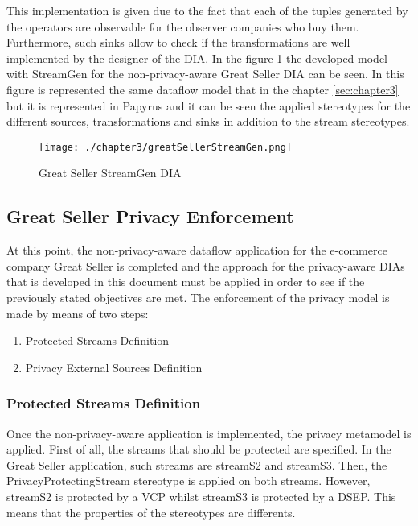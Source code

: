 This implementation is given due to the fact that each of the tuples generated by the operators are observable for the observer companies who buy them. Furthermore, such sinks allow to check if the transformations are well implemented by the designer of the DIA. In the figure \ref{fig:Great Seller StreamGen DIA} the developed model with StreamGen for the non-privacy-aware Great Seller DIA can be seen. In this figure is represented the same dataflow model that in the chapter \ref{sec:chapter3} but it is represented in Papyrus and it can be seen the applied stereotypes for the different sources, transformations and sinks in addition to the stream stereotypes.

\begin{figure}
\centering
{\texttt{[image: ./chapter3/greatSellerStreamGen.png]}}
\caption{Great Seller StreamGen DIA}
\label{fig:Great Seller StreamGen DIA}
\end{figure}

\subsection{Great Seller Privacy Enforcement}

At this point, the non-privacy-aware dataflow application for the e-commerce company Great Seller is completed and the approach for the privacy-aware DIAs that is developed in this document must be applied in order to see if the previously stated objectives are met. The enforcement of the privacy model is made by means of two steps:

\begin{enumerate}
\item Protected Streams Definition
\item Privacy External Sources Definition
\end{enumerate}

\subsubsection{Protected Streams Definition}

Once the non-privacy-aware application is implemented, the privacy metamodel is applied. First of all, the streams that should be protected are specified. In the Great Seller application, such streams are streamS2 and streamS3. Then, the PrivacyProtectingStream stereotype is applied on both streams. However, streamS2 is protected by a VCP whilst streamS3 is protected by a DSEP. This means that the properties of the stereotypes are differents.

